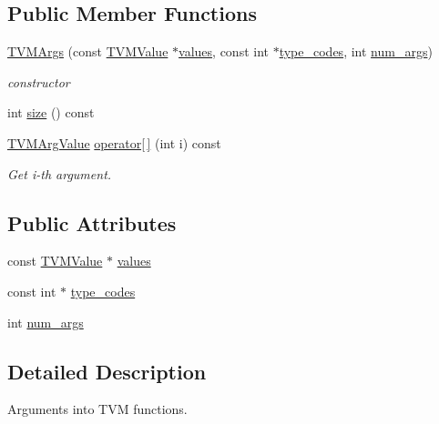 \subsection*{Public Member Functions}
\begin{DoxyCompactItemize}
\item 
\hyperlink{classtvm_1_1runtime_1_1TVMArgs_a5d2aeac7387e436e6e19d7a6dfe91307}{T\+V\+M\+Args} (const \hyperlink{unionTVMValue}{T\+V\+M\+Value} $\ast$\hyperlink{classtvm_1_1runtime_1_1TVMArgs_a3b99059e2f1ad08c99b42b5bee82752f}{values}, const int $\ast$\hyperlink{classtvm_1_1runtime_1_1TVMArgs_abdb0f929087b14eb28d75c7a047cef9e}{type\+\_\+codes}, int \hyperlink{classtvm_1_1runtime_1_1TVMArgs_afec79c909bdf103a01cdb4732c0afdf3}{num\+\_\+args})
\begin{DoxyCompactList}\small\item\em constructor \end{DoxyCompactList}\item 
int \hyperlink{classtvm_1_1runtime_1_1TVMArgs_aab545038cd3023195731bae5d6026b9f}{size} () const 
\item 
\hyperlink{classtvm_1_1runtime_1_1TVMArgValue}{T\+V\+M\+Arg\+Value} \hyperlink{classtvm_1_1runtime_1_1TVMArgs_a92845a3902afa7207adcaca1e03f8aaa}{operator\mbox{[}$\,$\mbox{]}} (int i) const 
\begin{DoxyCompactList}\small\item\em Get i-\/th argument. \end{DoxyCompactList}\end{DoxyCompactItemize}
\subsection*{Public Attributes}
\begin{DoxyCompactItemize}
\item 
const \hyperlink{unionTVMValue}{T\+V\+M\+Value} $\ast$ \hyperlink{classtvm_1_1runtime_1_1TVMArgs_a3b99059e2f1ad08c99b42b5bee82752f}{values}
\item 
const int $\ast$ \hyperlink{classtvm_1_1runtime_1_1TVMArgs_abdb0f929087b14eb28d75c7a047cef9e}{type\+\_\+codes}
\item 
int \hyperlink{classtvm_1_1runtime_1_1TVMArgs_afec79c909bdf103a01cdb4732c0afdf3}{num\+\_\+args}
\end{DoxyCompactItemize}


\subsection{Detailed Description}
Arguments into T\+VM functions. 

